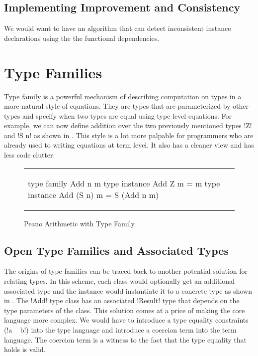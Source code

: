 \documentclass[format=sigplan,manuscript,review,screen, nonacm]{acmart}
\begin{document}
\subsection{Implementing Improvement and Consistency}
We would want to have an algorithm that can detect inconsistent instance declarations using the the functional
dependencies.


\section{Type Families}
Type family is a powerful mechanism of describing computation on types in a more
natural style of equations. They are types that are parameterized by other types
and specify when two types are equal using type level equations.
For example, we can now define addition over the two previously mentioned types !Z! and !S n!
as shown in . This style is a lot more palpable for programmers
who are already used to writing equations at term level.
It also has a cleaner view and has less code clutter.

\begin{figure}[ht]
  \begin{tabular}{l r}
    \begin{code}
      type family Add n m
      type instance  Add Z     m = m
      type instance  Add (S n) m = S (Add n m)
    \end{code}
  \end{tabular}
  \caption{Peano Arithmetic with Type Family}
  \label{fig:add-ty-fam}
\end{figure}

\subsection{Open Type Families and Associated Types}
The origins of type families can be traced back to another potential solution for relating
types. In this scheme, each class would optionally get an additional associated type and the instance
would instantiate it to a concrete type as shown in .
The !Add! type class has an associated !Result! type that depends on the type parameters
of the class. This solution comes at a price of making the core language more complex.
We would have to introduce a type equality constraints (!a ~ b!) into
the type language and introduce a coercion term into the term language. The coercion term
is a witness to the fact that the type equality that holds is valid.
\end{document}
